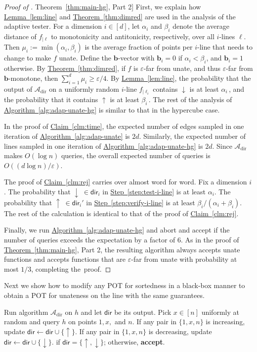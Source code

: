 \documentclass[11pt]{article}
\numberwithin{equation}{section}
\theoremstyle{definition}
\theoremstyle{plain}
\newcommand{\R}{\mathbb R}
\newcommand{\expref}[2]{\hyperref[#2]{#1~\ref{#2}}}
\newcommand{\eps}{\varepsilon}
\newcommand{\bb}{\ensuremath{\mathbf{b}}}
\newcommand{\dir}{\mathsf{dir}}
\newcommand{\mpot}{\mathcal{A}_{\text{dir}}}
\newcommand{\Alg}[1]{\expref{Algorithm}{alg:#1}}
\newcommand{\Thm}[1]{\expref{Theorem}{thm:#1}}
\newcommand{\Lem}[1]{\expref{Lemma}{lem:#1}}
\newcommand{\Clm}[1]{\expref{Claim}{clm:#1}}
\newcommand{\Step}[1]{\expref{Step}{step:#1}}
\begin{document}
\begin{proof}[Proof of \Thm{main-hg}, Part 2]
First, we explain how \Lem{line} and \Thm{dimred} are used in the analysis of the adaptive tester.
For a dimension $i\in[d]$, let $\alpha_i$ and $\beta_i$ denote the average distance of $f_{|\ell}$ to monotonicity and
%
%
antitonicity, %
respectively, %
over all $i$-lines $\ell$.
Then $\mu_i := \min(\alpha_i,\beta_i)$ is the average fraction of points per $i$-line that needs to change to make $f$ unate.
Define the $\bb$-vector with $\bb_i = 0$ if $\alpha_i < \beta_i$,
and $\bb_i = 1$ otherwise.
By \Thm{dimred},
if $f$ is $\eps$-far from unate, and thus $\eps$-far from $\bb$-monotone,
then $\sum_{i=1}^d \mu_i \geq \eps/4$.
%
By \Lem{line},
the probability that the output of $\mpot$ on a uniformly random  
%
$i$-line $f_{|\ell_i}$ contains $\downarrow$
%
is at least $\alpha_i$\,,
and the probability that it contains $\uparrow$ is at least $\beta_i$\,.
%
%
%
The rest of the analysis of \Alg{adap-unate-hg} is similar to that in the 
hypercube case.

In the proof of \Clm{time}, the expected number of edges sampled in one iteration of \Alg{adap-unate} is $2d$. Similarly, the expected number of lines sampled in one iteration of \Alg{adap-unate-hg} is $2d$. Since $\mpot$ makes $O(\log n)$ queries, the overall expected number of queries is $O((d\log n)/\eps)$.

The proof of \Clm{rej} carries over almost word for word. Fix a dimension $i$. The probability that $\downarrow \; \in \dir_i$ in \Step{test-i-line} is at least $\alpha_i$.
The probability that $\uparrow \; \in \dir_i'$ in \Step{verify-i-line} is at least ${\beta_i}/{(\alpha_i + \beta_i)}$.
The rest of the calculation is identical to that of the proof of \Clm{rej}.

Finally, we run \Alg{adap-unate-hg} and abort and accept if the number of queries exceeds the expectation by a factor of 6. As in the proof of \Thm{main-hg}, Part 2, the resulting algorithm always accepts unate functions and accepts functions that are $\eps$-far from unate with probability at most $1/3$, completing the~proof.
\end{proof}


%

Next we show how to modify any POT for sortedness in a black-box manner to obtain a POT for unateness on the line with the same guarantees.

\begin{algorithm}
\caption{The POT for Unateness over the Line}\label{alg:unateness-line}
\Input{
query %
access to a function $h:[n] \to \R$.}
\DontPrintSemicolon
\BlankLine
\nl Run algorithm $\mpot$ on $h$ and let $\dir$ be its output. \;
\nl Pick $x \in [n]$ uniformly at random and query $h$ on points $1,x,$ and $n$. \label{step:pick-x} \;
\nl If any pair in $\{1,x,n\}$ is increasing, update $\dir\gets\dir\cup\{\uparrow\}$. \;
\nl If any pair in $\{1,x,n\}$ is decreasing, update $\dir\gets\dir\cup\{\downarrow\}$. \;
 if $\dir=\{\uparrow,\downarrow\}$; otherwise, {\bf accept}.
\end{algorithm}
\end{document}
